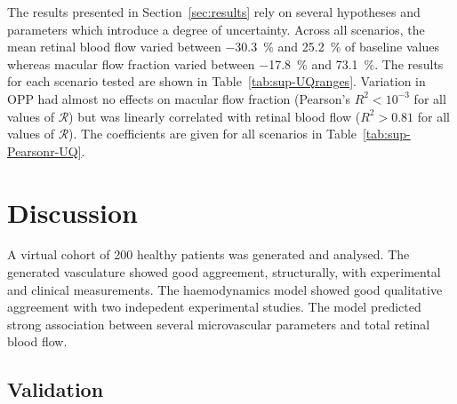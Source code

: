 \documentclass[11pt,]{article}
\begin{document}
The results presented in Section~\ref{sec:results} rely on several hypotheses and parameters which introduce a degree of uncertainty.
Across all scenarios, the mean retinal blood flow varied between \SI{-30.3}{\percent} and \SI{25.2}{\percent} of baseline values whereas macular flow fraction varied between \SI{-17.8}{\percent} and \SI{73.1}{\percent}.
The results for each scenario tested are shown in Table~\ref{tab:sup-UQranges}.
Variation in OPP had almost no effects on macular flow fraction (Pearson's $R^2<10^{-3}$ for all values of $\mathcal R$) but was linearly correlated with retinal blood flow ($R^2>0.81$ for all values of $\mathcal R$).
The coefficients are given for all scenarios in Table~\ref{tab:sup-Pearsonr-UQ}.


\section{Discussion}\label{sec:discussion}

A virtual cohort of 200 healthy patients was generated and analysed. 
The generated vasculature showed good aggreement, structurally, with experimental and clinical measurements.
The haemodynamics model showed good qualitative aggreement with two indepedent experimental studies.
The model predicted strong association between several microvascular parameters and total retinal blood flow.

\subsection{Validation}\label{sec:disc-validation}
\end{document}

